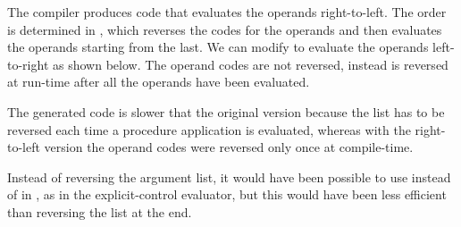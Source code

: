 \begin{exe}[5.36]
    The compiler produces code that evaluates the operands right-to-left. The 
    order is determined in , which reverses the codes for 
    the operands and then evaluates the operands starting from the last. We can 
    modify  to evaluate the operands left-to-right as 
    shown below. The operand codes are not reversed, instead  is 
    reversed at run-time after all the operands have been evaluated.

    The generated code is slower that the original version because the list has 
    to be reversed each time a procedure application is evaluated, whereas with 
    the right-to-left version the operand codes were reversed only once at 
    compile-time.

    Instead of reversing the argument list, it would have been possible to use 
     instead of  in , as 
    in the explicit-control evaluator, but this would have been less efficient 
    than reversing the list at the end.
\end{exe}
